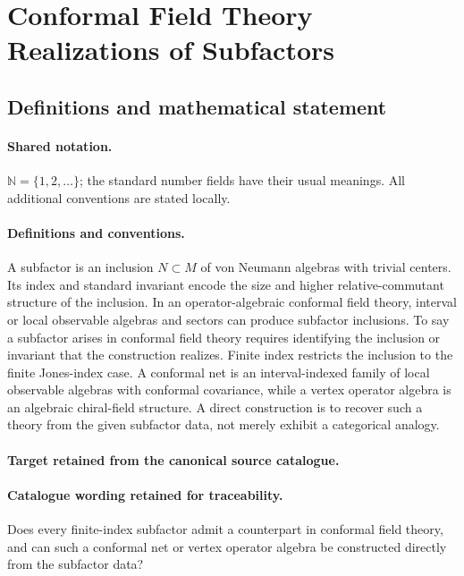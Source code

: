 \documentclass[11pt]{article}
\begin{document}
\section{Conformal Field Theory Realizations of Subfactors}\label{statement}

\subsection{Definitions and mathematical statement}

\paragraph{Shared notation.}$\mathbb N=\{1,2,\ldots\}$; the standard number fields have their usual meanings. All additional conventions are stated locally.


\paragraph{Definitions and conventions.}
A subfactor is an inclusion $N\subset M$ of von Neumann algebras with trivial centers. Its index and standard invariant encode the size and higher relative-commutant structure of the inclusion. In an operator-algebraic conformal field theory, interval or local observable algebras and sectors can produce subfactor inclusions. To say a subfactor arises in conformal field theory requires identifying the inclusion or invariant that the construction realizes. Finite index restricts the inclusion to the finite Jones-index case. A conformal net is an interval-indexed family of local observable algebras with conformal covariance, while a vertex operator algebra is an algebraic chiral-field structure. A direct construction is to recover such a theory from the given subfactor data, not merely exhibit a categorical analogy.

\paragraph{Target retained from the canonical source catalogue.}
\paragraph{Catalogue wording retained for traceability.}
Does every finite-index subfactor admit a counterpart in conformal field theory, and can such a conformal net or vertex operator algebra be constructed directly from the subfactor data?
\end{document}
